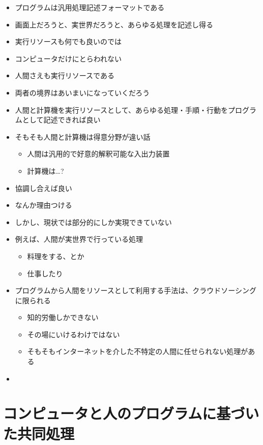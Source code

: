 \begin{itemize}
\item
  プログラムは汎用処理記述フォーマットである
\item
  画面上だろうと、実世界だろうと、あらゆる処理を記述し得る
\item
  実行リソースも何でも良いのでは
\item
  コンピュータだけにとらわれない
\item
  人間さえも実行リソースである
\item
  両者の境界はあいまいになっていくだろう
\item
  人間と計算機を実行リソースとして、あらゆる処理・手順・行動をプログラムとして記述できれば良い
\item
  そもそも人間と計算機は得意分野が違い話

  \begin{itemize}
  \itemsep1pt\parskip0pt
  \item
    人間は汎用的で好意的解釈可能な入出力装置
  \item
    計算機は\ldots{}?
  \end{itemize}
\item
  協調し合えば良い
\item
  なんか理由つける
\item
  しかし、現状では部分的にしか実現できていない
\item
  例えば、人間が実世界で行っている処理

  \begin{itemize}
  \itemsep1pt\parskip0pt
  \item
    料理をする、とか
  \item
    仕事したり
  \end{itemize}
\item
  プログラムから人間をリソースとして利用する手法は、クラウドソーシングに限られる

  \begin{itemize}
  \itemsep1pt\parskip0pt
  \item
    知的労働しかできない
  \item
    その場にいけるわけではない
  \item
    そもそもインターネットを介した不特定の人間に任せられない処理がある
  \end{itemize}
\item
\end{itemize}

\section{コンピュータと人のプログラムに基づいた共同処理}\label{ux30b3ux30f3ux30d4ux30e5ux30fcux30bfux3068ux4ebaux306eux30d7ux30edux30b0ux30e9ux30e0ux306bux57faux3065ux3044ux305fux5171ux540cux51e6ux7406}

